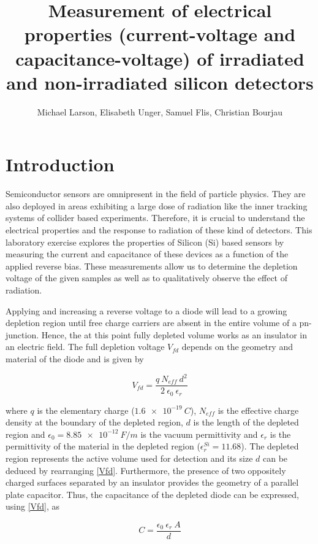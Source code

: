 \documentclass[11pt,a4paper]{report}
\title{Measurement of electrical properties (current-voltage and capacitance-voltage) of irradiated and non-irradiated silicon detectors}
\author{Michael Larson, Elisabeth Unger, Samuel Flis, Christian Bourjau}
\begin{document}
\maketitle

\section*{Introduction}
\label{sec:introduction}

Semiconductor sensors are omnipresent in the field of particle physics.
They are also deployed in areas exhibiting a large dose of radiation like the inner tracking systems of collider based experiments.
Therefore, it is crucial to understand the electrical properties and the response to radiation of these kind of detectors.
This laboratory exercise explores the  properties of Silicon (Si) based sensors by measuring the current and capacitance of these devices as a function of the applied reverse bias.
These measurements allow us to determine the depletion voltage of the given samples as well as to qualitatively observe the effect of radiation.

Applying and increasing a reverse voltage to a diode will lead to a growing depletion region until free charge carriers are absent in the entire volume of a pn-junction.
Hence, the at this point fully depleted volume works as an insulator in an electric field. The full depletion voltage $V_{fd}$ depends on the geometry and material of the diode and is given by 

\begin{equation}
  \label{Vfd}
  V_{fd} = \frac{q ~ N_{eff} ~ d^2}{2 ~ \epsilon_0 ~ \epsilon_r}
\end{equation}

where $q$ is the elementary charge ($\SI{1.6e-19}{C}$), $N_{eff}$ is the effective charge density at the boundary of the depleted region, $d$ is the length of the depleted region and $\epsilon_0 = \SI{8.85e-12}{F/m}$ is the vacuum permittivity and $\epsilon_r$ is the permittivity of the material in the depleted region ($\epsilon_r^{Si} = 11.68$)\cite{cv_iv_manual}.
The depleted region represents the active volume used for detection and its size $d$ can be deduced by rearranging \eqref{Vfd}.
Furthermore, the presence of two oppositely charged surfaces separated by an insulator provides the geometry of a parallel plate capacitor. Thus, the capacitance of the depleted diode can be expressed, using \eqref{Vfd}, as

\begin{equation}
  \label{C}
  C = \frac{\epsilon_{0} ~ \epsilon_{r} ~ A}{d}
\end{equation}
\end{document}
